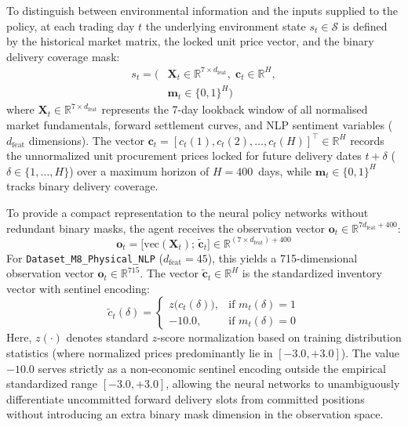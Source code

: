 To distinguish between environmental information and the inputs supplied to the policy, at each trading day $t$ the underlying environment state $s_t \in \mathcal{S}$ is defined by the historical market matrix, the locked unit price vector, and the binary delivery coverage mask:
\begin{equation}
\begin{aligned}
    s_t = \Big( &\mathbf{X}_t \in \mathbb{R}^{7 \times d_{\text{feat}}},\; \mathbf{c}_t \in \mathbb{R}^{H}, \\
    &\mathbf{m}_t \in \{0, 1\}^{H} \Big)
\end{aligned}
\label{eq:state_space}
\end{equation}
where $\mathbf{X}_t \in \mathbb{R}^{7 \times d_{\text{feat}}}$ represents the 7-day lookback window of all normalised market fundamentals, forward settlement curves, and NLP sentiment variables ($d_{\text{feat}}$ dimensions). The vector $\mathbf{c}_t = [c_t(1), c_t(2), \dots, c_t(H)]^{\top} \in \mathbb{R}^{H}$ records the unnormalized unit procurement prices locked for future delivery dates $t+\delta$ ($\delta \in \{1, \dots, H\}$) over a maximum horizon of $H = 400$~days, while $\mathbf{m}_t \in \{0, 1\}^H$ tracks binary delivery coverage.

To provide a compact representation to the neural policy networks without redundant binary masks, the agent receives the observation vector $\mathbf{o}_t \in \mathbb{R}^{7 d_{\text{feat}} + 400}$:
\begin{equation}
    \mathbf{o}_t = \big[ \text{vec}(\mathbf{X}_t);\, \tilde{\mathbf{c}}_t \big] \in \mathbb{R}^{(7 \times d_{\text{feat}}) + 400}
    \label{eq:observation_vector}
\end{equation}
For \texttt{Dataset\_\allowbreak M8\_\allowbreak Physical\_\allowbreak NLP} ($d_{\text{feat}} = 45$), this yields a 715-dimensional observation vector $\mathbf{o}_t \in \mathbb{R}^{715}$. The vector $\tilde{\mathbf{c}}_t \in \mathbb{R}^H$ is the standardized inventory vector with sentinel encoding:
\begin{equation}
    \tilde{c}_t(\delta) = 
    \begin{cases}
        z\big(c_t(\delta)\big), & \text{if } m_t(\delta) = 1 \\
        -10.0, & \text{if } m_t(\delta) = 0
    \end{cases}
    \label{eq:sentinel_encoding}
\end{equation}
Here, $z(\cdot)$ denotes standard $z$-score normalization based on training distribution statistics (where normalized prices predominantly lie in $[-3.0, +3.0]$). The value $-10.0$ serves strictly as a non-economic sentinel encoding outside the empirical standardized range $[-3.0, +3.0]$, allowing the neural networks to unambiguously differentiate uncommitted forward delivery slots from committed positions without introducing an extra binary mask dimension in the observation space.

